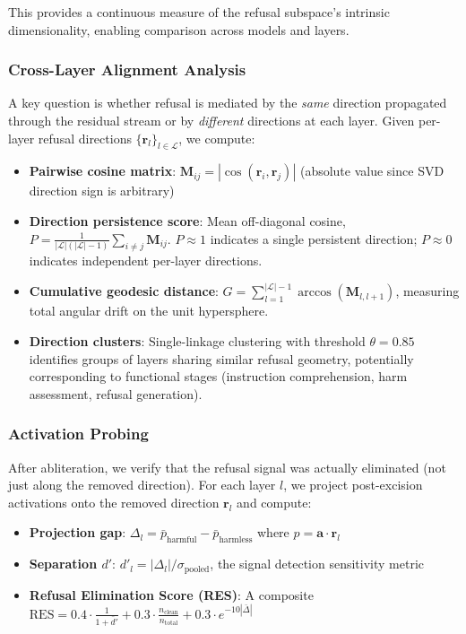 \documentclass[11pt]{article}
\begin{document}
This provides a continuous measure of the refusal subspace's intrinsic dimensionality, enabling comparison across models and layers.

\subsubsection{Cross-Layer Alignment Analysis}
\label{sec:cross_layer}

A key question is whether refusal is mediated by the \emph{same} direction propagated through the residual stream or by \emph{different} directions at each layer. Given per-layer refusal directions $\{\mathbf{r}_l\}_{l \in \mathcal{L}}$, we compute:

\begin{itemize}
    \item \textbf{Pairwise cosine matrix}: $\mathbf{M}_{ij} = |\cos(\mathbf{r}_i, \mathbf{r}_j)|$ (absolute value since SVD direction sign is arbitrary)
    \item \textbf{Direction persistence score}: Mean off-diagonal cosine, $P = \frac{1}{|\mathcal{L}|(|\mathcal{L}|-1)} \sum_{i \neq j} \mathbf{M}_{ij}$. $P \approx 1$ indicates a single persistent direction; $P \approx 0$ indicates independent per-layer directions.
    \item \textbf{Cumulative geodesic distance}: $G = \sum_{l=1}^{|\mathcal{L}|-1} \arccos(\mathbf{M}_{l,l+1})$, measuring total angular drift on the unit hypersphere.
    \item \textbf{Direction clusters}: Single-linkage clustering with threshold $\theta = 0.85$ identifies groups of layers sharing similar refusal geometry, potentially corresponding to functional stages (instruction comprehension, harm assessment, refusal generation).
\end{itemize}

\subsubsection{Activation Probing}
\label{sec:activation_probe}

After abliteration, we verify that the refusal signal was actually eliminated (not just along the removed direction). For each layer $l$, we project post-excision activations onto the removed direction $\mathbf{r}_l$ and compute:

\begin{itemize}
    \item \textbf{Projection gap}: $\Delta_l = \bar{p}_{\text{harmful}} - \bar{p}_{\text{harmless}}$ where $p = \mathbf{a} \cdot \mathbf{r}_l$
    \item \textbf{Separation $d'$}: $d'_l = |\Delta_l| / \sigma_{\text{pooled}}$, the signal detection sensitivity metric
    \item \textbf{Refusal Elimination Score (RES)}: A composite $\text{RES} = 0.4 \cdot \frac{1}{1 + \bar{d}'} + 0.3 \cdot \frac{n_{\text{clean}}}{n_{\text{total}}} + 0.3 \cdot e^{-10|\bar{\Delta}|}$
\end{itemize}
\end{document}
